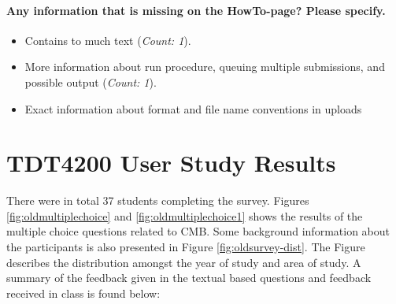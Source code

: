 \paragraph*{Any information that is missing on the HowTo-page? Please specify.} \hfill
\begin{itemize}
  \item Contains to much text (\textit{Count: 1}).
  \item More information about run procedure, queuing multiple submissions, and possible output (\textit{Count: 1}).
  \item Exact information about format and file name conventions in uploads
\end{itemize}

\section{TDT4200 User Study Results}
There were in total 37 students completing the survey. Figures \ref{fig:oldmultiplechoice} and \ref{fig:oldmultiplechoice1} shows the results of the multiple choice questions related to CMB. Some background information about the participants is also presented in Figure \ref{fig:oldsurvey-dist}. The Figure describes the distribution amongst the year of study and area of study. A summary of the feedback given in the textual based questions and feedback received in class is found below:

